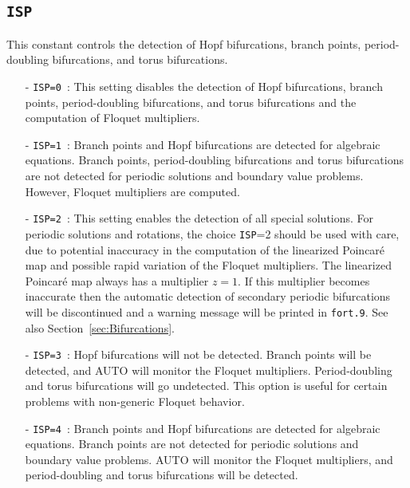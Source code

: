 \documentclass[12pt]{report}
\begin{document}
\subsection{\texttt{ISP}}  \label{sec:ISP}
This constant controls the detection of Hopf bifurcations,
branch points, period-doubling bifurcations, and torus bifurcations. 
\begin{itemize}
\item[-] {\tt ISP=0}~:  
  This setting disables the detection of Hopf bifurcations,
  branch points, period-doubling 
  bifurcations, and torus bifurcations and the computation of 
  Floquet multipliers.
\item[-] {\tt ISP=1}~:  
  Branch points and Hopf bifurcations are detected for algebraic
  equations. Branch points, period-doubling bifurcations and torus
  bifurcations are not detected for periodic solutions and boundary
  value problems. However, Floquet multipliers are computed.
\item[-] {\tt ISP=2}~: This setting enables the detection of all special 
 solutions.
 For periodic solutions and rotations, the choice {\tt ISP}=2 should be used with
 care, due to potential inaccuracy in the computation of the
 linearized Poincar\'e map and possible rapid variation of the
 Floquet multipliers.
 The linearized Poincar\'e map always has a multiplier $z=1$.
 If this multiplier becomes inaccurate
 then the automatic detection of secondary periodic
 bifurcations will be discontinued and a
 warning message will be printed in {\tt fort.9}.
 See also Section~\ref{sec:Bifurcations}.
\item[-] {\tt ISP=3}~:  
  Hopf bifurcations will not be detected. 
  Branch points will be detected, and {\cal AUTO} will monitor the 
  Floquet multipliers. Period-doubling and torus bifurcations will go undetected. 
  This option is useful for certain problems with non-generic Floquet behavior.
\item[-] {\tt ISP=4}~:  
  Branch points and Hopf bifurcations are detected for algebraic
  equations. Branch points are not detected for
  periodic solutions and boundary value problems.
  {\cal AUTO} will monitor the Floquet multipliers, and period-doubling
  and torus bifurcations will be detected.
\end{itemize}
\end{document}
